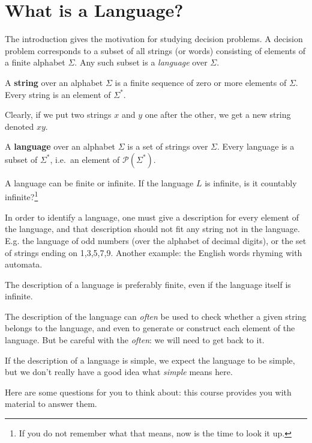 \section{What is a Language?}

The introduction gives the motivation for studying decision
problems. A decision problem corresponds to a subset of all strings
(or words) consisting of elements of a finite alphabet $\Sigma$. Any
such subset is a {\em language} over $\Sigma$.

\begin{definition}
A {\bf string} over an alphabet $\Sigma$ is a finite sequence of zero or more elements of $\Sigma$. Every string is an element of $\Sigma^*$.
\end{definition}

Clearly, if we put two strings $x$ and $y$ one after the other, we get
a new string denoted $xy$.

\begin{definition}
A {\bf language} over an alphabet $\Sigma$ is a set of strings over $\Sigma$. Every language is a subset of $\Sigma^*$, i.e.\ an element of $\mathcal{P}(\Sigma^*)$.
\end{definition}

A language can be finite or infinite. If the language $L$ is infinite,
is it countably infinite?\footnote{If you do not remember what that
means, now is the time to look it up.}

In order to identify a language, one must give a description for every
element of the language, and that description should not fit any
string not in the language. E.g. the language of odd numbers (over the
alphabet of decimal digits), or the set of strings ending on
1,3,5,7,9. Another example: the English words rhyming with automata.

The description of a language is preferably finite, even if the
language itself is infinite.

The description of the language can {\em often} be used to check whether a
given string belongs to the language, and even to generate or
construct each element of the language. But be careful with the {\em
often}: we will need to get back to it.

If the description of a language is simple, we expect the language to
be simple, but we don't really have a good idea what {\em simple}
means here.

Here are some questions for you to think about: this course provides
you with material to answer them.

